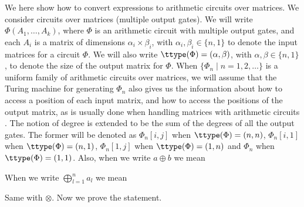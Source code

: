 



We here show how to convert \langfor expressions to arithmetic circuits over matrices.
We consider circuits over matrices (multiple output gates). We will write 
$\Phi(A_1,\ldots ,A_k)$, where $\Phi$ is an arithmetic circuit with multiple output gates, and each 
$A_i$ is a matrix of dimensions $\alpha_i\times \beta_i$, with $\alpha_i,\beta_i \in \{n,1\}$ to denote 
the input matrices for a circuit $\Phi$. We will also write $\ttype(\Phi)=(\alpha,\beta)$, with 
$\alpha,\beta\in \{n,1\}$, to denote the size of the output matrix for $\Phi$. 
When $\{\Phi_n\mid n=1,2,\ldots\}$ is a uniform family of 
arithmetic circuits over matrices, we will assume that the Turing machine for generating $\Phi_n$ also 
gives us the information about how to access a position of each input matrix, and how to access the 
positions of the output matrix, as is usually done when handling matrices with arithmetic 
circuits \cite{Raz02}. The notion of degree is extended to be the sum of the degrees of all 
the output gates. The former will be denoted as $\Phi_{n}[i,j]$ when $\ttype(\Phi)=(n,n)$, 
$\Phi_{n}[i,1]$ when $\ttype(\Phi)=(n,1)$, $\Phi_{n}[1,j]$ when $\ttype(\Phi)=(1,n)$ and 
$\Phi_{n}$ when $\ttype(\Phi)=(1,1)$. Also, when we write $a \oplus b$ we mean 

\begin{center}
\end{center}
When we write $\bigoplus_{l=1}^n a_l$ we mean 

\begin{center}
\end{center}
Same with $\otimes$. Now we prove the statement.

